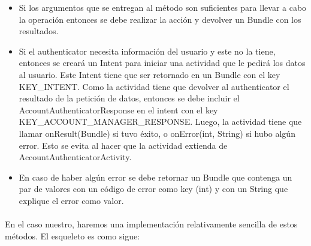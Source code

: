 \documentclass[10pt]{extarticle}
\begin{document}
\begin{itemize}
	\item Si los argumentos que se entregan al método son suficientes para llevar a cabo la operación entonces se debe realizar la acción y devolver un Bundle con los resultados.
	\item Si el authenticator necesita información del usuario y este no la tiene, entonces se creará un Intent para iniciar una actividad que le pedirá los datos al usuario. Este Intent tiene que ser retornado en un Bundle con el key KEY\_INTENT. Como la actividad tiene que devolver al authenticator el resultado de la petición de datos, entonces se debe incluir el AccountAuthenticatorResponse en el intent con el key KEY\_ACCOUNT\_MANAGER\_RESPONSE. Luego, la actividad tiene que llamar onResult(Bundle) si tuvo éxito, o onError(int, String) si hubo algún error. Esto se evita al hacer que la actividad extienda de AccountAuthenticatorActivity.
	\item En caso de haber algún error se debe retornar un Bundle que contenga un par de valores con un código de error como key (int) y con un String que explique el error como valor.
\end{itemize}

\paragraph{}
En el caso nuestro, haremos una implementación relativamente sencilla de estos métodos. El esqueleto es como sigue:
\end{document}
